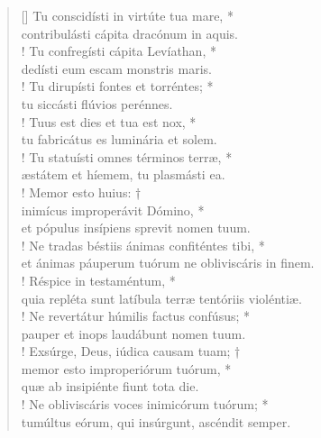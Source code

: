 \begin{verse}[\versewidth]
Tu conscidísti in virtúte tua mare, *\\
contribulásti cápita dracónum in aquis.\\!
\vin Tu confregísti cápita Levíathan, *\\
\vin dedísti eum escam monstris maris.\\!
Tu dirupísti fontes et torréntes; *\\
tu siccásti flúvios perénnes.\\!
\vin Tuus est dies et tua est nox, *\\
\vin tu fabricátus es luminária et solem.\\!
Tu statuísti omnes términos terræ, *\\
æstátem et híemem, tu plasmásti ea.\\!
\vin Memor esto huius: †\\
\vin inimícus improperávit Dómino, *\\
\vin et pópulus insípiens sprevit nomen tuum.\\!
Ne tradas béstiis ánimas confiténtes tibi, *\\
et ánimas páuperum tuórum ne obliviscáris in finem.\\!
\vin Réspice in testaméntum, *\\
\vin quia repléta sunt latíbula terræ tentóriis violéntiæ.\\!
Ne revertátur húmilis factus confúsus; *\\
pauper et inops laudábunt nomen tuum.\\!
\vin Exsúrge, Deus, iúdica causam tuam; †\\
\vin memor esto improperiórum tuórum, *\\
\vin quæ ab insipiénte fiunt tota die.\\!
Ne obliviscáris voces inimicórum tuórum; *\\
tumúltus eórum, qui insúrgunt, ascéndit semper.\\
\end{verse}
\vspace{1cm}


